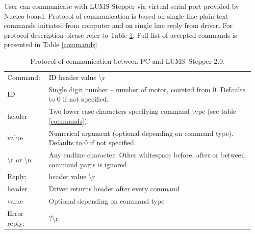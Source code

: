 \documentclass[10pt,article]{article}
\begin{document}
User can communicate with LUMS Stepper via virtual serial port provided by Nucleo board. Protocol of communication is based on single line plain-text commands initiated from computer and on single line reply from driver. For protocol description please refer to Table \ref{protocol}. Full list of accepted commands is presented in Table \ref{commands}

\begin{table}[ht]\centering
\begin{tabularx}{\textwidth}{lX}
\rowcolor[gray]{0.80} Command: & ID header value \textbackslash r \\
\rowcolor[gray]{0.95} ID & Single digit number – number of motor, counted from 0. Defaults to 0 if not specified.\\
\rowcolor[gray]{0.95} header & Two lower case characters specifying command type (see table \ref{commands}).\\
\rowcolor[gray]{0.95} value & Numerical argument (optional depending on command type). Defaults to 0 if not specified. \\
\rowcolor[gray]{0.95} \textbackslash r or \textbackslash n\ & Any endline character. Other whitespace before, after or between command parts is ignored. \\
\rowcolor[gray]{0.80} Reply: & header value \textbackslash r\\
\rowcolor[gray]{0.95} header & Driver returns header after every command \\
\rowcolor[gray]{0.95} value & Optional depending on command type\\
\rowcolor[gray]{0.80} Error reply: & ?\textbackslash r\\
\end{tabularx}
\caption{Protocol of communication between PC and LUMS\ Stepper 2.0.}\label{protocol}
\end{table}
\end{document}
